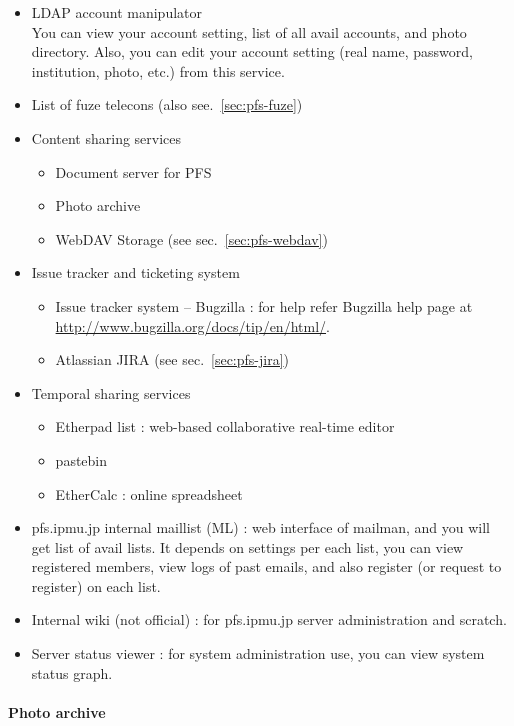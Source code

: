 \documentclass[a4paper,notitlepage]{article}
\begin{document}
\begin{itemize}
  \item LDAP account manipulator \\
    You can view your account setting, list of all avail accounts, and photo 
    directory. 
    Also, you can edit your account setting (real name, password, institution, 
    photo, etc.) from this service.
  \item List of fuze telecons (also see.~\ref{sec:pfs-fuze})
  \item Content sharing services
    \begin{itemize}
      \item Document server for PFS
      \item Photo archive
      \item WebDAV Storage (see sec.~\ref{sec:pfs-webdav})
    \end{itemize}
  \item Issue tracker and ticketing system
    \begin{itemize}
      \item Issue tracker system -- Bugzilla : 
        for help refer Bugzilla help page at 
        \url{http://www.bugzilla.org/docs/tip/en/html/}.
      \item Atlassian JIRA (see sec.~\ref{sec:pfs-jira})
    \end{itemize}
  \item Temporal sharing services
    \begin{itemize}
      \item Etherpad list : web-based collaborative real-time editor
      \item pastebin
      \item EtherCalc : online spreadsheet
    \end{itemize}
  \item pfs.ipmu.jp internal maillist (ML) :
    web interface of mailman, and you will get list of avail lists. 
    It depends on settings per each list, you can view registered members, 
    view logs of past emails, and also register (or request to register) on 
    each list. 
  \item Internal wiki (not official) : 
    for pfs.ipmu.jp server administration and scratch. 
  \item Server status viewer : 
    for system administration use, you can view system status graph.
\end{itemize}

\paragraph{Photo archive}
\end{document}
